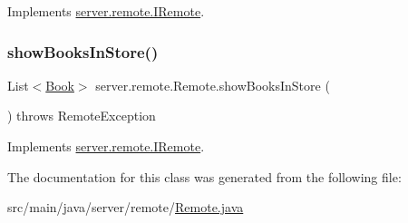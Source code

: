 Implements \hyperlink{interfaceserver_1_1remote_1_1_i_remote_a2e426f5eb58352993207ce0a24539f81}{server.\+remote.\+I\+Remote}.

\mbox{\label{classserver_1_1remote_1_1_remote_a131873c01bc4fe829dd7d2385c89ca87}} 
\subsubsection{\texorpdfstring{show\+Books\+In\+Store()}{showBooksInStore()}}
{\footnotesize\ttfamily List$<$\hyperlink{classserver_1_1data_1_1_book}{Book}$>$ server.\+remote.\+Remote.\+show\+Books\+In\+Store (\begin{DoxyParamCaption}{ }\end{DoxyParamCaption}) throws Remote\+Exception}



Implements \hyperlink{interfaceserver_1_1remote_1_1_i_remote_ac8a764235c51eff20d635f40707e377e}{server.\+remote.\+I\+Remote}.



The documentation for this class was generated from the following file\+:\begin{DoxyCompactItemize}
\item 
src/main/java/server/remote/\hyperlink{_remote_8java}{Remote.\+java}\end{DoxyCompactItemize}
